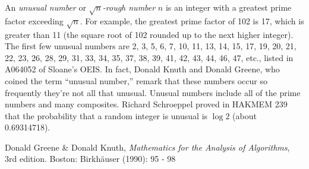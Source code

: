 \documentclass[12pt]{article}
\begin{document}
An {\em unusual number} or {\em $\sqrt{n}$-rough number} $n$ is an integer with a greatest prime factor exceeding $\sqrt{n}$. For example, the greatest prime factor of 102 is 17, which is greater than 11 (the square root of 102 rounded up to the next higher integer). The first few unusual numbers are 2, 3, 5, 6, 7, 10, 11, 13, 14, 15, 17, 19, 20, 21, 22, 23, 26, 28, 29, 31, 33, 34, 35, 37, 38, 39, 41, 42, 43, 44, 46, 47, etc., listed in A064052 of Sloane's OEIS. In fact, Donald Knuth and Donald Greene, who coined the term ``unusual number,'' remark that these numbers occur so frequently they're not all that unusual. Unusual numbers include all of the prime numbers and many composites. Richard Schroeppel proved in HAKMEM 239 that the probability that a random integer is unusual is $\log 2$ (about 0.69314718).

\begin{thebibliography}{1}
 Donald Greene \& Donald Knuth, {\it Mathematics for the Analysis of Algorithms}, 3rd edition. Boston: Birkh\"auser (1990): 95 - 98
\end{thebibliography}

\end{document}
